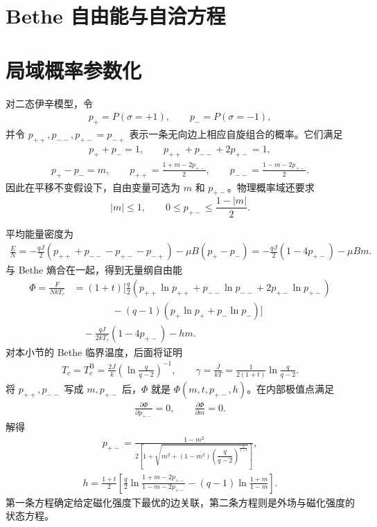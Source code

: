 \section{Bethe 自由能与自洽方程}

\section{局域概率参数化}

对二态伊辛模型，令
\begin{align*}
	p_+=P(\sigma=+1),\qquad p_-=P(\sigma=-1),
\end{align*}
并令 \(p_{++},p_{--},p_{+-}=p_{-+}\) 表示一条无向边上相应自旋组合的概率。它们满足
\begin{align*}
	p_++p_-=1,\qquad
	p_{++}+p_{--}+2p_{+-}=1,
\end{align*}
\begin{align*}
	p_+-p_-=m,\qquad
	p_{++}=\frac{1+m-2p_{+-}}2,\qquad
	p_{--}=\frac{1-m-2p_{+-}}2.
\end{align*}
因此在平移不变假设下，自由变量可选为 \(m\) 和 \(p_{+-}\)。物理概率域还要求
\[
	|m|\leq1,\qquad
	0\leq p_{+-}\leq\frac{1-|m|}{2}.
\]

平均能量密度为
\begin{align*}
	\frac EN
	=-\frac{qJ}{2}
	\left(p_{++}+p_{--}-p_{+-}-p_{-+}\right)
	-\mu B(p_+-p_-)
	=-\frac{qJ}{2}\left(1-4p_{+-}\right)-\mu Bm .
\end{align*}
与 Bethe 熵合在一起，得到无量纲自由能
\begin{align*}
	\Phi=\frac{F}{NkT_c}
	&=(1+t)\Bigg[
	\frac q2\left(
	p_{++}\ln p_{++}+p_{--}\ln p_{--}+2p_{+-}\ln p_{+-}\right)\\
	&\qquad\qquad
	-(q-1)\left(
	p_+\ln p_++p_-\ln p_-\right)\Bigg]\\
	&\quad-\frac{qJ}{2kT_c}(1-4p_{+-})-hm .
\end{align*}
对本小节的 Bethe 临界温度，后面将证明
\begin{align*}
	T_c=T_c^{\mathrm B}
	=\frac{2J}{k}\left(\ln\frac{q}{q-2}\right)^{-1},
\qquad
\gamma=\frac{J}{kT}
	=\frac{1}{2(1+t)}\ln\frac{q}{q-2}.
\end{align*}
将 \(p_{++},p_{--}\) 写成 \(m,p_{+-}\) 后，\(\Phi\) 就是 \(\Phi(m,t,p_{+-},h)\)。在内部极值点满足
\begin{align*}
	\frac{\partial\Phi}{\partial p_{+-}}=0,\qquad
	\frac{\partial\Phi}{\partial m}=0.
\end{align*}
解得
\begin{align*}
	p_{+-}
	=\frac{1-m^2}
	{2\left[1+\sqrt{m^2+(1-m^2)
	\left(\dfrac q{q-2}\right)^{\frac{2}{1+t}}}\right]},
\end{align*}
\begin{align*}
	h=\frac{1+t}{2}\left[
	\frac q2\ln\frac{1+m-2p_{+-}}{1-m-2p_{+-}}
	-(q-1)\ln\frac{1+m}{1-m}\right].
\end{align*}
第一条方程确定给定磁化强度下最优的边关联，第二条方程则是外场与磁化强度的状态方程。

